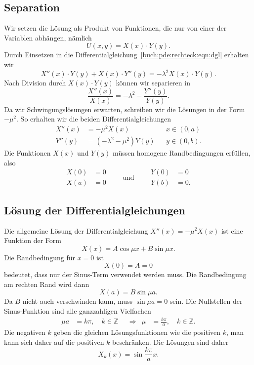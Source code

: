 \subsection{Separation}
Wir setzen die Lösung als Produkt von Funktionen, die nur von einer
der Variablen abhängen, nämlich
\[
U(x,y)
=
X(x) \cdot Y(y).
\]
Durch Einsetzen in die
Differentialgleichung~\eqref{buch:pde:rechteck:eqn:dgl}
erhalten wir
\[
X''(x) \cdot Y(y) + X(x)\cdot Y''(y) = -\lambda^2 X(x)\cdot Y(y).
\]
Nach Division durch $X(x)\cdot Y(y)$ können wir separieren in 
\[
\frac{X''(x)}{X(x)}=-\lambda^2 - \frac{Y''(y)}{Y(y)}.
\]
Da wir Schwingungslösungen erwarten, schreiben wir die Lösungen
in der Form $-\mu^2$. 
So erhalten wir die beiden Differentialgleichungen
\[
\begin{aligned}
X''(x) &= -\mu^2 X(x)&&x\in (0,a)
\\
Y''(y) &= (-\lambda^2-\mu^2) Y(y)&& y\in(0,b).
\end{aligned}
\]
Die Funktionen $X(x)$ und $Y(y)$ müssen homogene Randbedingungen
erfüllen, also
\[
\begin{aligned}
X(0) &= 0\\
X(a) &= 0
\end{aligned}
\qquad\text{und}\qquad
\begin{aligned}
Y(0) &= 0\\
Y(b) &= 0.
\end{aligned}
\]

%
%
\subsection{Lösung der Differentialgleichungen}
Die allgemeine Lösung der Differentialgleichung $X''(x) = -\mu^2 X(x)$
ist eine Funktion der Form
\[
X(x) = A\cos\mu x + B\sin\mu x.
\]
Die Randbedingung für $x=0$ ist
\[
X(0) = A = 0
\]
bedeutet, dass nur der Sinus-Term verwendet werden muss.
Die Randbedingung am rechten Rand wird dann
\[
X(a) = B\sin\mu a.
\]
Da $B$ nicht auch verschwinden kann, muss $\sin\mu a=0$ sein.
Die Nullstellen der Sinus-Funktion sind alle ganzzahligen Vielfachen
\begin{align*}
\mu a &= k\pi,\quad k\in\mathbb{Z}
&&\Rightarrow&
\mu &= \frac{k\pi}{a},\quad k\in\mathbb{Z}.
\end{align*}
Die negativen $k$ geben die gleichen Lösungsfunktionen wie die positiven
$k$, man kann sich daher auf die positiven $k$ beschränken.
Die Lösungen sind daher
\[
X_k(x) = \sin \frac{k\pi}{a}x.
\]

